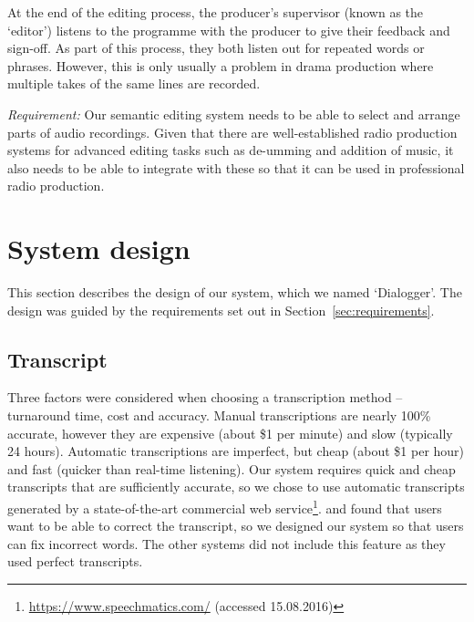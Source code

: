 At the end of the editing process, the producer's supervisor (known as the
`editor') listens to the programme with the producer to give their feedback and
sign-off. As part of this process, they both listen out for repeated words or
phrases. However, this is only usually a problem in drama production where
multiple takes of the same lines are recorded.

\textit{Requirement:} Our semantic editing system needs to be able to select and arrange parts of audio recordings.
Given that there are well-established radio production systems for advanced editing tasks such as de-umming and
addition of music, it also needs to be able to integrate with these so that it can be used in professional radio
production.


%
%
%
%
%
%

\section{System design}
This section describes the design of our system, which we named `Dialogger'. The design was guided by the requirements
set out in Section~\ref{sec:requirements}.

\subsection{Transcript}
Three factors were considered when choosing a transcription method -- turnaround time, cost and accuracy. Manual
transcriptions are nearly 100\% accurate, however they are expensive (about \$1 per minute) and slow (typically 24
hours). Automatic transcriptions are imperfect, but cheap (about \$1 per hour) and fast (quicker than real-time
listening). Our system requires quick and cheap transcripts that are sufficiently accurate, so we chose to use automatic
transcripts generated by a state-of-the-art commercial web service\footnote{\url{https://www.speechmatics.com/}
  (accessed 15.08.2016)}.
\citet{Whittaker2004} and \citet{Sivaraman2016} found that users want to be able to correct the transcript, so we
designed our system so that users can fix incorrect words.
The other systems did not include this feature as they used perfect transcripts.

